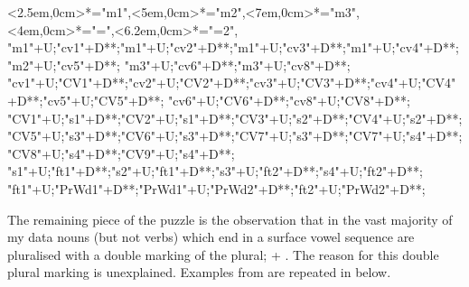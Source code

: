 \begin{multicols}{2}
\begin{exe}
{		<2.5em,0cm>*="m1",<5em,0cm>*="m2",<7em,0cm>*="m3",
		<4em,0cm>*\as{=}="=",<6.2em,0cm>*\as{=}="=2",
		"m1"+U;"cv1"+D**\dir{-};"m1"+U;"cv2"+D**\dir{-};"m1"+U;"cv3"+D**\dir{-};"m1"+U;"cv4"+D**\dir{-};"m2"+U;"cv5"+D**\dir{-};
		"m3"+U;"cv6"+D**\dir{-};"m3"+U;"cv8"+D**\dir{-};
		"cv1"+U;"CV1"+D**\dir{-};"cv2"+U;"CV2"+D**\dir{-};"cv3"+U;"CV3"+D**\dir{-};"cv4"+U;"CV4"+D**\dir{-};"cv5"+U;"CV5"+D**\dir{-};
		"cv6"+U;"CV6"+D**\dir{-};"cv8"+U;"CV8"+D**\dir{-};
		"CV1"+U;"s1"+D**\dir{-};"CV2"+U;"s1"+D**\dir{-};"CV3"+U;"s2"+D**\dir{-};"CV4"+U;"s2"+D**\dir{-};
		"CV5"+U;"s3"+D**\dir{-};"CV6"+U;"s3"+D**\dir{-};"CV7"+U;"s3"+D**\dir{-};"CV7"+U;"s4"+D**\dir{-};"CV8"+U;"s4"+D**\dir{-};"CV9"+U;"s4"+D**\dir{-};
		"s1"+U;"ft1"+D**\dir{-};"s2"+U;"ft1"+D**\dir{-};"s3"+U;"ft2"+D**\dir{-};"s4"+U;"ft2"+D**\dir{-};
		"ft1"+U;"PrWd1"+D**\dir{-};"PrWd1"+U;"PrWd2"+D**\dir{-};"ft2"+U;"PrWd2"+D**\dir{-};
	\endxy}\label{as:kaes=n=ee}
\end{exe}
\end{multicols}

The remaining piece of the puzzle is the observation that in the vast majority of my data
nouns (but not verbs) which end in a surface vowel sequence
are pluralised with a double marking of the plural;
 +  {\ra} .
The reason for this double plural marking is unexplained.
Examples from 
are repeated in  below.

\begin{exe}
	\label{ex:pl->=n/VVnoun-2}
\end{exe}